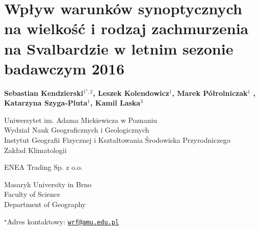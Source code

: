 \documentclass[\main/boa.tex]{subfiles}
\begin{document}
\section{Wpływ warunków synoptycznych na wielkość i rodzaj zachmurzenia na Svalbardzie w letnim sezonie badawczym 2016}

\begin{center}
  {\bf  {} Sebastian Kendzierski$^{1^\star,2}$,  Leszek Kolendowicz$^{1}$,  Marek Półrolniczak$^{1}$ ,  Katarzyna Szyga-Pluta$^{1}$,   Kamil Laska$^{3}$}
\end{center}

\vskip 0.3cm

\begin{affiliations}
\begin{enumerate}
\begin{minipage}{0.915\textwidth}
\centering
\item Uniwersytet im. Adama Mickiewicza w Poznaniu \\ Wydział Nauk Geograficznych i Geologicznych  \\ Instytut Geografii Fizycznej i Kształtowania Środowiska Przyrodniczego\\
Zakład Klimatologii \\[-2pt]
\item ENEA Trading Sp. z o.o.
\item Masaryk University in Brno \\ Faculty of Science\\ Department of Geography
\end{minipage}
\end{enumerate}
$^\star$Adres kontaktowy: \href{mailto:wrf@amu.edu.pl}{\nolinkurl{wrf@amu.edu.pl}}\\
\end{affiliations}

\vskip 0.5cm


\vskip 0.5cm
\end{document}

